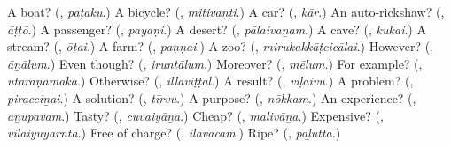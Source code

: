 \begin{tcolorbox}[breakable,colback=teal!4,colframe=teal!35!black,title={Before you move on}]
A boat? (\textbf{}, \emph{paṭaku}.) A bicycle? (\textbf{}, \emph{mitivaṇṭi}.) A car? (\textbf{}, \emph{kār}.) An auto-rickshaw? (\textbf{}, \emph{āṭṭō}.) A passenger? (\textbf{}, \emph{payaṇi}.) A desert? (\textbf{}, \emph{pālaivaṉam}.) A cave? (\textbf{}, \emph{kukai}.) A stream? (\textbf{}, \emph{ōṭai}.) A farm? (\textbf{}, \emph{paṇṇai}.) A zoo? (\textbf{}, \emph{mirukakkāṭcicālai}.) However? (\textbf{}, \emph{āṉālum}.) Even though? (\textbf{}, \emph{iruntālum}.) Moreover? (\textbf{}, \emph{mēlum}.) For example? (\textbf{}, \emph{utāraṇamāka}.) Otherwise? (\textbf{}, \emph{illāviṭṭāl}.) A result? (\textbf{}, \emph{viḷaivu}.) A problem? (\textbf{}, \emph{piracciṉai}.) A solution? (\textbf{}, \emph{tīrvu}.) A purpose? (\textbf{}, \emph{nōkkam}.) An experience? (\textbf{}, \emph{aṉupavam}.) Tasty? (\textbf{}, \emph{cuvaiyāṉa}.) Cheap? (\textbf{}, \emph{malivāṉa}.) Expensive? (\textbf{}, \emph{vilaiyuyarnta}.) Free of charge? (\textbf{}, \emph{ilavacam}.) Ripe? (\textbf{}, \emph{paḻutta}.)
\end{tcolorbox}
